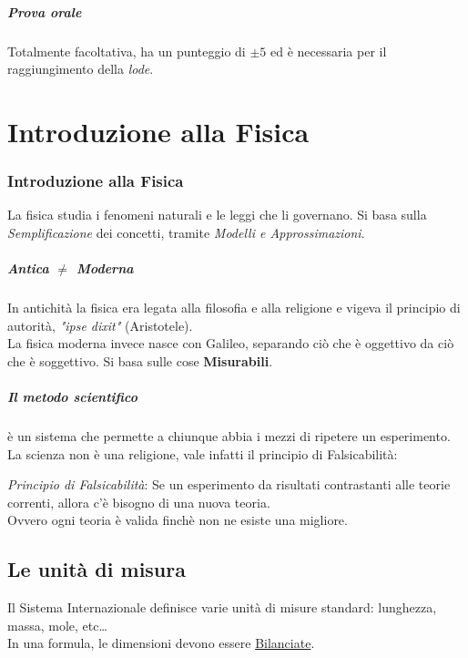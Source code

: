 \documentclass[12pt, a4paper, openany]{book}
\begin{document}
\paragraph*{Prova orale}
Totalmente facoltativa, ha un punteggio di $\pm 5$ ed è necessaria per il raggiungimento della \emph{lode}.

\chapter*{Introduzione alla Fisica}

\subsection*{Introduzione alla Fisica}
La fisica studia i fenomeni naturali e le leggi che li governano.
Si basa sulla \emph{Semplificazione} dei concetti, tramite \emph{Modelli e Approssimazioni}.

\paragraph*{Antica $\neq$ Moderna} In antichità la fisica era legata alla filosofia e alla religione
e vigeva il principio di autorità, \emph{"ipse dixit"} (Aristotele).
\\La fisica moderna invece nasce con Galileo, separando ciò che è oggettivo da ciò che è soggettivo.
Si basa sulle cose \textbf{Misurabili}.
\paragraph*{Il metodo scientifico} è un sistema che permette a chiunque abbia i mezzi di ripetere un esperimento.
La scienza non è una religione, vale infatti il principio di Falsicabilità:
\begin{center}
    \emph{Principio di Falsicabilità}: Se un esperimento da risultati contrastanti alle teorie correnti, allora c'è bisogno di una nuova teoria.
    \\Ovvero ogni teoria è valida finchè non ne esiste una migliore.
\end{center}
\section*{Le unità di misura}
Il Sistema Internazionale definisce varie unità di misure standard: lunghezza, massa, mole, etc\dots
\\In una formula, le dimensioni devono essere \underline{Bilanciate}.
\end{document}

